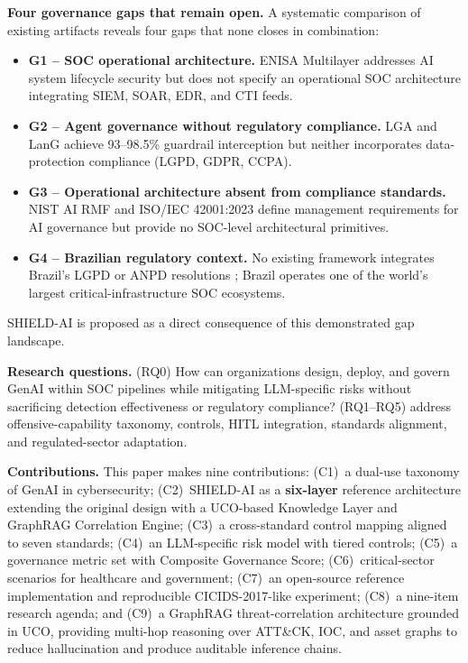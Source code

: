 \documentclass[journal]{IEEEtran}
\begin{document}
\textbf{Four governance gaps that remain open.}
A systematic comparison of existing artifacts reveals four gaps that none closes in combination:
\begin{itemize}[noitemsep,leftmargin=1em]
  \item \textbf{G1 -- SOC operational architecture.}
    ENISA Multilayer \cite{enisa2023multilayer} addresses AI system lifecycle security but does
    not specify an operational SOC architecture integrating SIEM, SOAR, EDR, and CTI feeds.
  \item \textbf{G2 -- Agent governance without regulatory compliance.}
    LGA \cite{lga2026} and LanG \cite{lang2026} achieve 93--98.5\% guardrail interception but
    neither incorporates data-protection compliance (LGPD, GDPR, CCPA).
  \item \textbf{G3 -- Operational architecture absent from compliance standards.}
    NIST AI RMF \cite{nist2023airmf} and ISO/IEC 42001:2023 \cite{iso42001} define management
    requirements for AI governance but provide no SOC-level architectural primitives.
  \item \textbf{G4 -- Brazilian regulatory context.}
    No existing framework integrates Brazil's LGPD \cite{lgpd2018} or ANPD resolutions
    \cite{anpd15}; Brazil operates one of the world's largest critical-infrastructure SOC
    ecosystems.
\end{itemize}
SHIELD-AI is proposed as a direct consequence of this demonstrated gap landscape.

\textbf{Research questions.}
(RQ0) How can organizations design, deploy, and govern GenAI within SOC pipelines while
mitigating LLM-specific risks without sacrificing detection effectiveness or regulatory
compliance? (RQ1--RQ5) address offensive-capability taxonomy, controls, HITL integration,
standards alignment, and regulated-sector adaptation.

\textbf{Contributions.} This paper makes nine contributions:
(C1)~a dual-use taxonomy of GenAI in cybersecurity;
(C2)~SHIELD-AI as a \textbf{six-layer} reference architecture extending the original design
with a UCO-based Knowledge Layer and GraphRAG Correlation Engine;
(C3)~a cross-standard control mapping aligned to seven standards;
(C4)~an LLM-specific risk model with tiered controls;
(C5)~a governance metric set with Composite Governance Score;
(C6)~critical-sector scenarios for healthcare and government;
(C7)~an open-source reference implementation and reproducible CICIDS-2017-like experiment;
(C8)~a nine-item research agenda; and
(C9)~a GraphRAG threat-correlation architecture grounded in UCO, providing multi-hop reasoning
over ATT\&CK, IOC, and asset graphs to reduce hallucination and produce auditable inference
chains.
\end{document}
